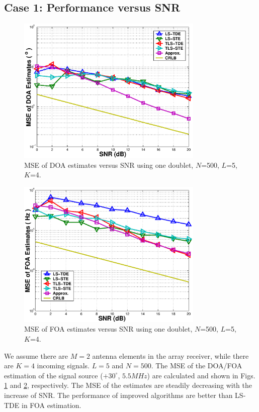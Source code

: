 \documentclass[conference]{IEEEtran}
\begin{document}
\subsection*{Case 1: Performance versus SNR}
\begin{figure}
\begin{center}
\includegraphics[width=3.5in]{SF_DOASNR.eps}
\caption{MSE of DOA estimates versus SNR using one doublet,
$N$=500, $L$=5, $K$=4.} \label{SF_DOASNR}
\end{center}
\end{figure}
\begin{figure}
\begin{center}
\includegraphics[width=3.5in]{SF_FOASNR.eps}
\caption{MSE of FOA estimates versus SNR using one doublet,
$N$=500, $L$=5, $K$=4.} \label{SF_FOASNR}
\end{center}
\end{figure}

We assume there are $M=2$ antenna elements in the array receiver,
while there are $K=4$ incoming signals. $L=5$ and $N=500$. The MSE
of the DOA/FOA estimation of the signal source ($+30^{\circ}$,
$5.5MHz$) are calculated and shown in Figs. \ref{SF_DOASNR} and
\ref{SF_FOASNR}, respectively. The MSE of the estimates are
steadily decreasing with the increase of SNR. The performance of
improved algorithms are better than LS-TDE in FOA estimation.
\end{document}
